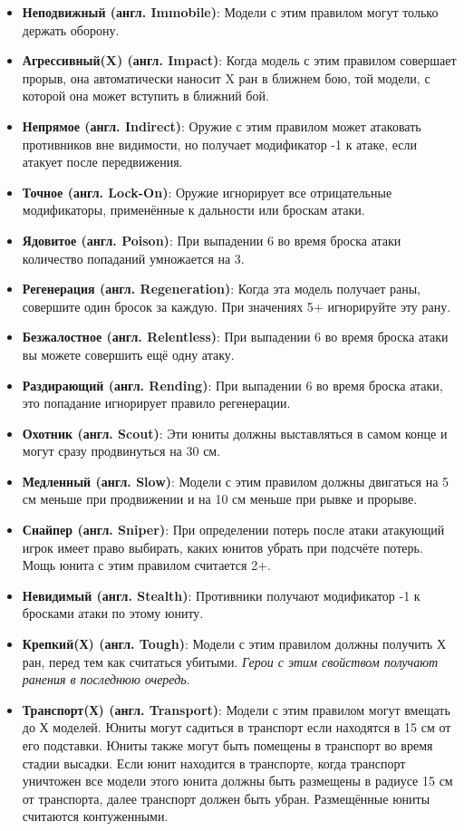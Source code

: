 \documentclass[twocolumn]{article}
\newcommand{\h}[1]{\textbf{#1}}
\begin{document}
\begin{itemize}
    \item \h{Неподвижный (англ. Immobile)}: Модели с этим правилом могут только держать оборону.
    \item \h{Агрессивный(X) (англ. Impact)}: Когда модель с этим правилом совершает прорыв, она автоматически наносит X ран в ближнем бою, той модели, с которой она может вступить в ближний бой.
    \item \h{Непрямое (англ. Indirect)}: Оружие с этим правилом может атаковать противников вне видимости, но получает модификатор -1 к атаке, если атакует после передвижения.
    \item \h{Точное (англ. Lock-On)}: Оружие игнорирует все отрицательные модификаторы, применённые к дальности или броскам атаки.
    \item \h{Ядовитое (англ. Poison)}: При выпадении 6 во время броска атаки количество попаданий умножается на 3.
    \item \h{Регенерация (англ. Regeneration)}: Когда эта модель получает раны, совершите один бросок за каждую. При значениях 5+ игнорируйте эту рану.
    \item \h{Безжалостное (англ. Relentless)}: При выпадении 6 во время броска атаки вы можете совершить ещё одну атаку.
    \item \h{Раздирающий (англ. Rending)}: При выпадении 6 во время броска атаки, это попадание игнорирует правило регенерации.
    \item \h{Охотник (англ. Scout)}: Эти юниты должны выставляться в самом конце и могут сразу продвинуться на 30 см.
    \item \h{Медленный (англ. Slow)}: Модели с этим правилом должны двигаться на 5 см меньше при продвижении и на 10 см меньше при рывке и прорыве.
    \item \h{Снайпер (англ. Sniper)}: При определении потерь после атаки атакующий игрок имеет право выбирать, каких юнитов убрать при подсчёте потерь. Мощь юнита с этим правилом считается 2+.
    \item \h{Невидимый (англ. Stealth)}: Противники получают модификатор -1 к бросками атаки по этому юниту.
    \item \h{Крепкий(Х) (англ. Tough)}: Модели с этим правилом должны получить Х ран, перед тем как считаться убитыми. \emph{Герои с этим свойством получают ранения в последнюю очередь}.
    \item \h{Транспорт(Х) (англ. Transport)}: Модели с этим правилом могут вмещать до Х моделей. Юниты могут садиться в транспорт если находятся в 15 см от его подставки. Юниты также могут быть помещены в транспорт во время стадии высадки. Если юнит находится в транспорте, когда транспорт уничтожен все модели этого юнита должны быть размещены в радиусе 15 см от транспорта, далее транспорт должен быть убран. Размещённые юниты считаются контуженными.
\end{itemize}
\end{document}
